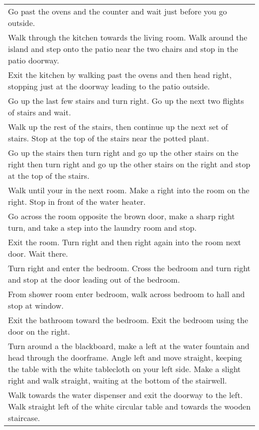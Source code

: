 \documentclass[10pt,twocolumn,letterpaper]{article}
\begin{document}
\begin{table*}[t]
	\small
	\begin{center}
		\begin{tabular}{p{17cm}}
			\toprule
			Go past the ovens and the counter and wait just before you go outside. \\
			Walk through the kitchen towards the living room. Walk around the island and step onto the patio near the two chairs and stop in the patio doorway. \\
			Exit the kitchen by walking past the ovens and then head right, stopping just at the doorway leading to the patio outside. \\
			\midrule
			Go up the last few stairs and turn right. Go up the next two flights of stairs and wait. \\
			Walk up the rest of the stairs, then continue up the next set of stairs.  Stop at the top of the stairs near the potted plant. \\
			Go up the stairs then turn right and go up the other stairs on the right then turn right and go up the other stairs on the right and stop at the top of the stairs. \\
			\midrule
			Walk until your in the next room. Make a right into the room on the right. Stop in front of the water heater. \\
			Go across the room opposite the brown door, make a sharp right turn, and take a step into the laundry room and stop. \\
			Exit the room. Turn right and then right again into the room next door. Wait there. \\
			\midrule
			Turn right and enter the bedroom. Cross the bedroom and turn right and stop at the door leading out of the bedroom. \\
			From shower room enter bedroom, walk across bedroom to hall and stop at window. \\
			Exit the bathroom toward the bedroom. Exit the bedroom using the door on the right. \\
			\midrule
			Turn around a the blackboard, make a left at the water fountain and head through the doorframe. Angle left and move straight, keeping the table with the white tablecloth on your left side. Make a slight right and walk straight, waiting at the bottom of the stairwell. \\
			Walk towards the water dispenser and exit the doorway to the left. Walk straight left of the white circular table and towards the wooden staircase. \\

\end{tabular}
\end{center}
\end{table*}
\end{document}
